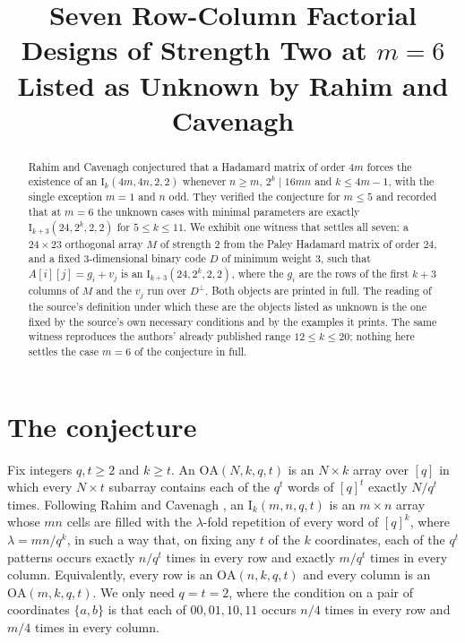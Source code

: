 \documentclass[11pt]{amsart}
\title[Seven row-column factorial designs of strength two]
{Seven Row-Column Factorial Designs of Strength Two at $m=6$ Listed as Unknown
by Rahim and Cavenagh}
\date{}
\newcommand{\Idesign}{\mathrm{I}}
\newcommand{\OA}{\mathrm{OA}}
\begin{document}
\begin{abstract}
Rahim and Cavenagh conjectured that a Hadamard matrix of order $4m$ forces the existence of an
$\Idesign_k(4m,4n,2,2)$ whenever $n\ge m$, $2^k\mid 16mn$ and $k\le 4m-1$, with the single
exception $m=1$ and $n$ odd. They verified the conjecture for $m\le5$ and recorded that at $m=6$
the unknown cases with minimal parameters are exactly
$\Idesign_{k+3}(24,2^k,2,2)$ for $5\le k\le 11$. We exhibit one witness that settles all seven:
a $24\times 23$ orthogonal array $M$ of strength $2$ from the Paley Hadamard matrix of order $24$,
and a fixed $3$-dimensional binary code $D$ of minimum weight $3$, such that
$A[i][j]=g_i+v_j$ is an $\Idesign_{k+3}(24,2^k,2,2)$, where the $g_i$ are the rows of the first
$k+3$ columns of $M$ and the $v_j$ run over $D^{\perp}$. Both objects are printed in full. The
reading of the source's definition under which these are the objects listed as unknown is the one
fixed by the source's own necessary conditions and by the examples it prints. The same
witness reproduces the authors' already published range $12\le k\le 20$; nothing here settles the
case $m=6$ of the conjecture in full.
\end{abstract}

\maketitle

\section{The conjecture}

Fix integers $q,t\ge2$ and $k\ge t$. An $\OA(N,k,q,t)$ is an $N\times k$ array over $[q]$ in which
every $N\times t$ subarray contains each of the $q^t$ words of $[q]^t$ exactly $N/q^t$ times.
Following Rahim and Cavenagh
\cite[Section~1]{RC2023}, an $\Idesign_k(m,n,q,t)$ is an $m\times n$ array whose $mn$ cells are
filled with the $\lambda$-fold repetition of every word of $[q]^k$, where $\lambda=mn/q^k$, in such
a way that, on fixing any $t$ of the $k$ coordinates, each of the $q^t$ patterns occurs exactly
$n/q^t$ times in every row and exactly $m/q^t$ times in every column. Equivalently, every row is an
$\OA(n,k,q,t)$ and every column is an $\OA(m,k,q,t)$. We only need $q=t=2$, where the condition on a
pair of coordinates $\{a,b\}$ is that each of $00,01,10,11$ occurs $n/4$ times in every row and
$m/4$ times in every column.
\end{document}
